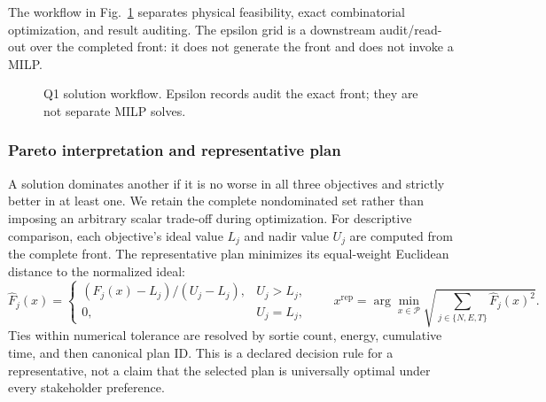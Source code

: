 \documentclass[11pt,a4paper]{article}
\begin{document}
The workflow in Fig.~\ref{fig:q1-workflow} separates physical feasibility, exact combinatorial optimization, and result auditing. The epsilon grid is a downstream audit/read-out over the completed front: it does not generate the front and does not invoke a MILP.

\begin{figure}[H]
\centering
{}
\caption{Q1 solution workflow. Epsilon records audit the exact front; they are not separate MILP solves.}
\label{fig:q1-workflow}
\end{figure}

\subsubsection{Pareto interpretation and representative plan}
A solution dominates another if it is no worse in all three objectives and strictly better in at least one. We retain the complete nondominated set rather than imposing an arbitrary scalar trade-off during optimization. For descriptive comparison, each objective's ideal value $L_j$ and nadir value $U_j$ are computed from the complete front. The representative plan minimizes its equal-weight Euclidean distance to the normalized ideal:
\begin{equation}
\widehat F_j(x)=\begin{cases}(F_j(x)-L_j)/(U_j-L_j),&U_j>L_j,\\0,&U_j=L_j,\end{cases}\qquad
x^{\mathrm{rep}}=\arg\min_{x\in\mathcal P}\sqrt{\sum_{j\in\{N,E,T\}}\widehat F_j(x)^2}.
\label{eq:representative}
\end{equation}
Ties within numerical tolerance are resolved by sortie count, energy, cumulative time, and then canonical plan ID. This is a declared decision rule for a representative, not a claim that the selected plan is universally optimal under every stakeholder preference.
\end{document}
